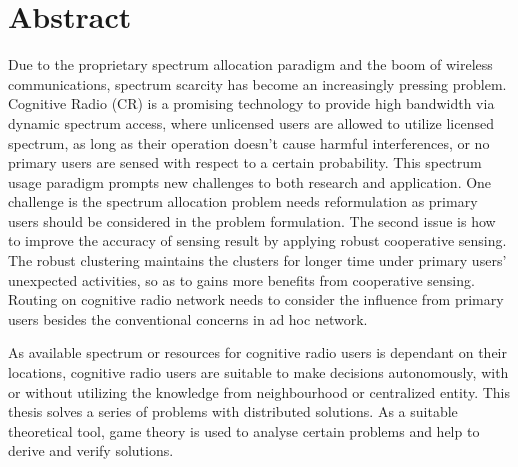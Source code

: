 \chapter{Abstract}
Due to the proprietary spectrum allocation paradigm and the boom of wireless communications, spectrum scarcity has become an increasingly pressing problem. 
Cognitive Radio (CR) is a promising technology to provide high bandwidth via dynamic spectrum access, where unlicensed users  are allowed to utilize licensed spectrum, as long as their operation doesn't cause harmful interferences, or no primary users are sensed with respect to a certain probability.
This spectrum usage paradigm prompts new challenges to both research and application.
One challenge is the spectrum allocation problem needs reformulation as primary users should be considered in the problem formulation.
The second issue is how to improve the accuracy of sensing result by applying robust cooperative sensing.
The robust clustering maintains the clusters for longer time under primary users' unexpected activities, so as to gains more benefits from cooperative sensing.
Routing on cognitive radio network needs to consider the influence from primary users besides the conventional concerns in ad hoc network.

As available spectrum or resources for cognitive radio users is dependant on their locations, cognitive radio users are suitable to make decisions autonomously, with or without utilizing the knowledge from neighbourhood or centralized entity.
This thesis solves a series of problems with distributed solutions.
As a suitable theoretical tool, game theory is used to analyse certain problems and help to derive and verify solutions.


